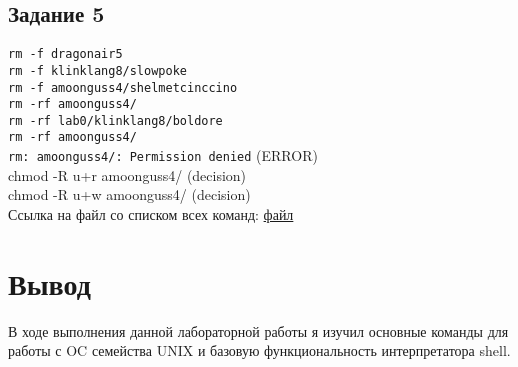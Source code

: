 \subsection*{Задание 5}
\verb|rm -f dragonair5| \\
\verb|rm -f klinklang8/slowpoke| \\
\verb|rm -f amoonguss4/shelmetcinccino| \\
\verb|rm -rf amoonguss4/| \\
\verb|rm -rf lab0/klinklang8/boldore| \\

\noindent \verb|rm -rf amoonguss4/| \\
\verb|rm: amoonguss4/: Permission denied| (ERROR) \\
chmod -R u+r amoonguss4/ (decision) \\
chmod -R u+w amoonguss4/ (decision) \\

\noindent \Large{Ссылка на файл со списком всех команд: \href{https://disk.yandex.ru/d/02RfeRSN2Qf4tA}{файл}}
\normalsize

\section*{Вывод}
В ходе выполнения данной лабораторной работы я изучил основные команды для работы с OC семейства UNIX и базовую функциональность интерпретатора shell. 

 